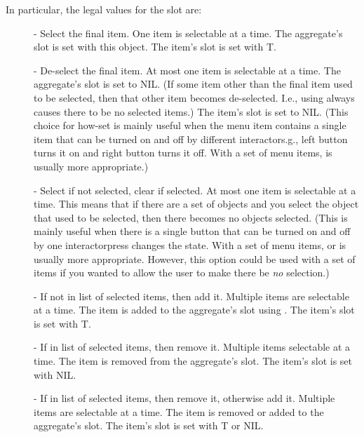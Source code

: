 In particular, the legal values for the  slot are:
\begin{description}
\item[]  
- Select the final item.  One item is selectable at a time.
The aggregate's  slot is set with
this object.  The item's  slot is set with T.

\item[]  
- De-select the final item.  At most one item is selectable at a time.
The aggregate's  slot is set to NIL.
(If some item other than the final item used to be selected, then that
other item becomes de-selected.  I.e., using  always causes
there to be no selected items.)
The item's  slot is set to NIL.  (This choice for how-set is
mainly useful when the menu item contains a single item that can be turned
on and off by different
interactors\dashe.g., left button turns it on and right button turns it
off.  With a set of menu items,  is usually more appropriate.)

\item[]  
- Select if not selected, clear if selected.  At most one item
is selectable at a time.  This means that if there are a set of objects and
you select the object that used to be selected, then there becomes no
objects selected.   (This is mainly useful when
there is a single button that can be turned on and off by one
interactor\dasheach press changes the state.  With a set of menu items,
 or  is usually more appropriate.  However, this
option could be used
with a set of items if you wanted to allow the user to make there be
{\it no} selection.)

\item[]  
- If not in list of selected items, then add it.  Multiple
items are selectable at a time.  The item is added to the aggregate's
 slot using .
The item's  slot is set with T.

\item[]  
- If in list of selected items, then remove it.  Multiple
items selectable at a time.  The item is removed from the aggregate's
 slot.  The item's  slot is set with NIL.

\item[]  
- If in list of selected items, then remove it, otherwise
add it.  Multiple items are selectable at a time.  The item is removed or
added to the aggregate's  slot.  The
item's  slot is set with T or NIL.


\end{description}
